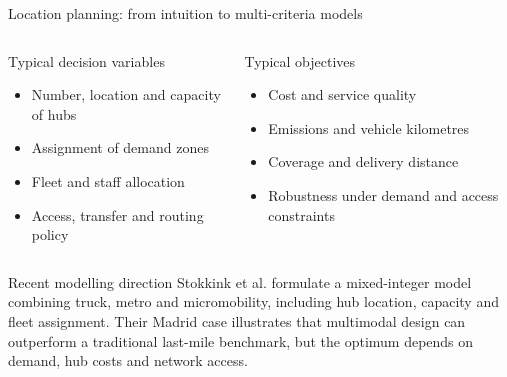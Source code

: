 \documentclass[aspectratio=169,11pt]{beamer}
\newcommand{\source}[1]{\par\vspace{2pt}{\tiny\textcolor{gray}{Source: #1}}}
\begin{document}
\begin{frame}{Location planning: from intuition to multi-criteria models}
\begin{columns}[T]
\begin{block}{Typical decision variables}
\begin{itemize}
  \item Number, location and capacity of hubs
  \item Assignment of demand zones
  \item Fleet and staff allocation
  \item Access, transfer and routing policy
\end{itemize}
\end{block}
\begin{block}{Typical objectives}
\begin{itemize}
  \item Cost and service quality
  \item Emissions and vehicle kilometres
  \item Coverage and delivery distance
  \item Robustness under demand and access constraints
\end{itemize}
\end{block}
\end{columns}
\vspace{3mm}
\begin{alertblock}{Recent modelling direction}
\footnotesize Stokkink et al. formulate a mixed-integer model combining truck, metro and micromobility, including hub location, capacity and fleet assignment. Their Madrid case illustrates that multimodal design can outperform a traditional last-mile benchmark, but the optimum depends on demand, hub costs and network access.
\end{alertblock}
\source{Stokkink \& Geroliminis (2025), “On the optimal micro-hub locations in a multi-modal last-mile delivery system”.}
\end{frame}
\end{document}
